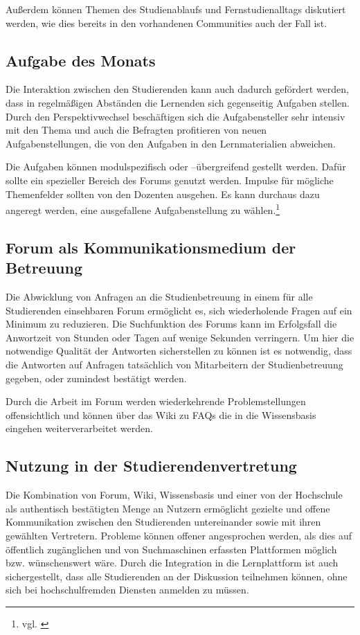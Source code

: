 Außerdem können Themen des Studienablaufs und Fernstudienalltags diskutiert werden, wie dies bereits in den vorhandenen Communities auch der Fall ist.

\subsection{Aufgabe des Monats} %
\label{sub:aufgabe_des_monats}
Die Interaktion zwischen den Studierenden kann auch dadurch gefördert werden, dass in regelmäßigen Abständen die Lernenden sich gegenseitig Aufgaben stellen. Durch den Perspektivwechsel beschäftigen sich die Aufgabensteller sehr intensiv mit den Thema und auch die Befragten profitieren von neuen Aufgabenstellungen, die von den Aufgaben in den Lernmaterialien abweichen.

Die Aufgaben können modulspezifisch oder –übergreifend gestellt werden. Dafür sollte ein spezieller Bereich des Forums genutzt werden. Impulse für mögliche Themenfelder sollten von den Dozenten ausgehen. Es kann durchaus dazu angeregt werden, eine ausgefallene Aufgabenstellung zu wählen.\footnote{vgl. \cite{dmark}}

\subsection{Forum als Kommunikationsmedium der Betreuung} %
\label{sub:forum_als_kommunikationsmedium_der_betreuung}
Die Abwicklung von Anfragen an die Studienbetreuung in einem für alle Studierenden einsehbaren Forum ermöglicht es, sich wiederholende Fragen auf ein Minimum zu reduzieren. Die Suchfunktion des Forums kann im Erfolgsfall die Anwortzeit von Stunden oder Tagen auf wenige Sekunden verringern. Um hier die notwendige Qualität der Antworten sicherstellen zu können ist es notwendig, dass die Antworten auf Anfragen tatsächlich von Mitarbeitern der Studienbetreuung gegeben, oder zumindest bestätigt werden.

Durch die Arbeit im Forum werden wiederkehrende Problemstellungen offensichtlich und können über das Wiki zu \ac{FAQ}s die in die Wissensbasis eingehen weiterverarbeitet werden.

\subsection{Nutzung in der Studierendenvertretung} %
\label{sub:nutzung_in_der_studierendenvertretung}
Die Kombination von Forum, Wiki, Wissensbasis und einer von der Hochschule als authentisch bestätigten Menge an Nutzern ermöglicht gezielte und offene Kommunikation zwischen den Studierenden untereinander sowie mit ihren gewählten Vertretern. Probleme können offener angesprochen werden, als dies auf öffentlich zugänglichen und von Suchmaschinen erfassten Plattformen möglich bzw. wünschenswert wäre. Durch die Integration in die Lernplattform ist auch sichergestellt, dass alle Studierenden an der Diskussion teilnehmen können, ohne sich bei hochschulfremden Diensten anmelden zu müssen.

